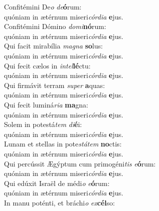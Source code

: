 \evenverse Confitémini De\textit{o} \textit{de}\textbf{ó}rum:~\*\\
\evenverse quóniam in ætérnum miseri\textit{cór}\textit{di}\textit{a} \textbf{e}jus.\\
\oddverse Confitémini Dómino \textit{do}\textit{mi}\textbf{nó}rum:~\*\\
\oddverse quóniam in ætérnum miseri\textit{cór}\textit{di}\textit{a} \textbf{e}jus.\\
\evenverse Qui facit mirabília \textit{ma}\textit{gna} \textbf{so}lus:~\*\\
\evenverse quóniam in ætérnum miseri\textit{cór}\textit{di}\textit{a} \textbf{e}jus.\\
\oddverse Qui fecit cælos in \textit{in}\textit{tel}\textbf{lé}ctu:~\*\\
\oddverse quóniam in ætérnum miseri\textit{cór}\textit{di}\textit{a} \textbf{e}jus.\\
\evenverse Qui firmávit terram \textit{su}\textit{per} \textbf{a}quas:~\*\\
\evenverse quóniam in ætérnum miseri\textit{cór}\textit{di}\textit{a} \textbf{e}jus.\\
\oddverse Qui fecit luminá\textit{ri}\textit{a} \textbf{ma}gna:~\*\\
\oddverse quóniam in ætérnum miseri\textit{cór}\textit{di}\textit{a} \textbf{e}jus.\\
\evenverse Solem in potestá\textit{tem} \textit{di}\textbf{é}i:~\*\\
\evenverse quóniam in ætérnum miseri\textit{cór}\textit{di}\textit{a} \textbf{e}jus.\\
\oddverse Lunam et stellas in pote\textit{stá}\textit{tem} \textbf{no}ctis:~\*\\
\oddverse quóniam in ætérnum miseri\textit{cór}\textit{di}\textit{a} \textbf{e}jus.\\
\evenverse Qui percússit Ægýptum cum primogéni\textit{tis} \textit{e}\textbf{ó}rum:~\*\\
\evenverse quóniam in ætérnum miseri\textit{cór}\textit{di}\textit{a} \textbf{e}jus.\\
\oddverse Qui edúxit Israël de médi\textit{o} \textit{e}\textbf{ó}rum:~\*\\
\oddverse quóniam in ætérnum miseri\textit{cór}\textit{di}\textit{a} \textbf{e}jus.\\
\evenverse In manu poténti, et bráchi\textit{o} \textit{ex}\textbf{cél}so:~\*\\
